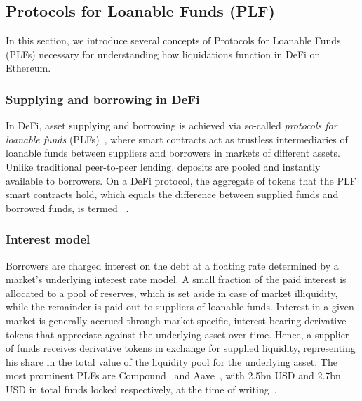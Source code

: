 \subsection{Protocols for Loanable Funds (PLF)}
\label{sec:plfs}
In this section, we introduce several concepts of Protocols for Loanable Funds (PLFs) necessary for understanding how liquidations function in DeFi on Ethereum.

\subsubsection{Supplying and borrowing in DeFi}
In DeFi, asset supplying and borrowing is achieved via so-called \textit{protocols for loanable funds} (PLFs)~\cite{gudgeon2020defi}, where smart contracts act as trustless intermediaries of loanable funds between suppliers and borrowers in markets of different assets.
Unlike traditional peer-to-peer lending, deposits are pooled and instantly available to borrowers.
On a DeFi protocol, the aggregate of tokens that the PLF smart contracts hold, which equals the difference between supplied funds and borrowed funds, is termed ~\cite{DeFiPulse2020}.

\subsubsection{Interest model}
Borrowers are charged interest on the debt at a floating rate determined by a market's underlying interest rate model.
A small fraction of the paid interest is allocated to a pool of reserves, which is set aside in case of market illiquidity, while the remainder is paid out to suppliers of loanable funds.
Interest in a given market is generally accrued through market-specific, interest-bearing derivative tokens that appreciate against the underlying asset over time.
Hence, a supplier of funds receives derivative tokens in exchange for supplied liquidity, representing his share in the total value of the liquidity pool for the underlying asset.
The most prominent PLFs are Compound~\cite{web:compoundfinance} and Aave~\cite{web:aave}, with 2.5bn USD and 2.7bn USD in total funds locked respectively, at the time of writing~\cite{DeFiPulse2020}.

